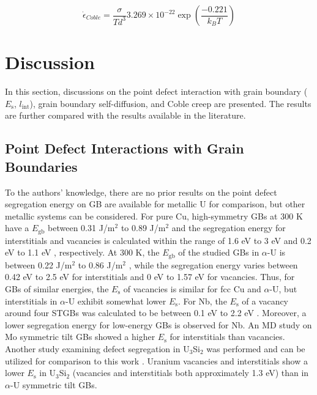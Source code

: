\documentclass[review]{elsarticle}
\begin{document}
\begin{equation}
\label{eq:coble2}
\dot{\epsilon}_{Coble} =\frac{\sigma}{T d^{3}} 3.269 \times 10^{-22} \exp\left(\frac{-0.221}{k_{B} T}\right)
\end{equation}



\FloatBarrier

\section{Discussion}

In this section, discussions on the point defect interaction with grain boundary ($E_{\mathrm{s}}$, $l_{\mathrm{int}}$), grain boundary self-diffusion, and Coble creep are presented. The results are further compared with the results available in the literature. 

\subsection{Point Defect Interactions with Grain Boundaries}



To the authors' knowledge, there are no prior results on the point defect segregation energy on GB are available for metallic U for comparison, but other metallic systems can be considered. For pure Cu, high-symmetry GBs at 300 K \cite{bai_cu_inter, bai_cu_gb_with_interstitial_inter} have a  $E_{\mathrm{gb}}$  between 0.31 J/m${^2}$ to 0.89 J/m${^2}$ and the segregation energy for interstitials and vacancies is calculated within the range of 1.6 eV to 3 eV and 0.2 eV to 1.1 eV \cite{bai_cu_inter}, respectively. At 300 K, the  $E_{\mathrm{gb}}$  of the studied GBs in $\alpha$-U is between 0.22 J/m${^2}$ to 0.86 J/m${^2}$ \cite{MAHBUBA2021153072}, while the segregation energy varies between 0.42 eV to 2.5 eV for interstitials and 0 eV to 1.57 eV for vacancies. Thus, for GBs of similar energies, the $E_{\mathrm{s}}$ of vacancies is similar for fcc Cu and $\alpha$-U, but interstitials in $\alpha$-U exhibit somewhat lower $E_{\mathrm{s}}$. For Nb, the $E_{\mathrm{s}}$ of a vacancy around four STGBs was calculated to be between 0.1 eV to 2.2 eV \cite{Popov2022}. Moreover, a lower segregation energy for low-energy GBs is observed for Nb. An MD study on Mo symmetric tilt GBs showed a higher $E_{\mathrm{s}}$ for interstitials than vacancies\cite{Novoselov2014}. Another study examining defect segregation in U$_3$Si$_2$ was performed and can be utilized for comparison to this work \cite{beelerUSi}. Uranium vacancies and interstitials show a lower $E_{\mathrm{s}}$ in U$_\mathrm{3}$Si$_\mathrm{2}$ (vacancies and interstitials both approximately 1.3 eV) than in $\alpha$-U symmetric tilt GBs. 
\end{document}
